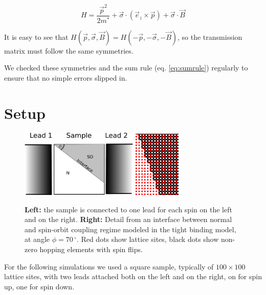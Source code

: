 \begin{equation}
H = \frac{\vec{p}^2}{2 m^*} + \vec \sigma \cdot (\vec e_z \times \vec p)  
    + \vec \sigma \cdot \vec B
\end{equation}

It is easy to see that $H(\vec p, \vec \sigma, \vec B) = H(-\vec p,
-\vec \sigma, -\vec B)$, so the transmission matrix must follow the
same symmetries.

We checked these symmetries and the sum rule (eq. \ref{eq:sumrule}) regularly
to ensure that no simple errors slipped in.

\section{Setup}

\begin{figure}
    \begin{center}
        \includegraphics[width=0.5\textwidth]{sample-lead-interface.pdf}%
        \hspace{0.1\textwidth}%
        \includegraphics[width=0.2\textwidth]{hopping.png}
    \end{center}
    \caption{\textbf{Left:} the sample is connected to one lead for each spin
        on the left and on the right.
        \textbf{Right:}
        Detail from an interface between normal and spin-orbit coupling regime modeled
        in the tight binding model, at angle $\phi = 70\,^{\circ}$.
        Red dots show lattice sites, black dots
        show non-zero hopping elements with spin flips.}
    \label{fig:interface-setup}
\end{figure}

For the following simulations we used a square sample, typically of $100
\times 100$ lattice sites, with two leads attached both on the left and on the
right, on for spin up, one for spin down.


